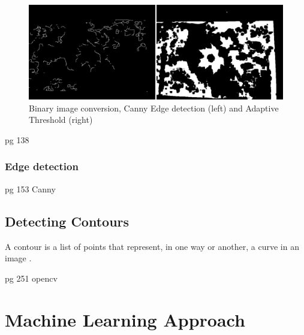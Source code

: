 \begin{figure}[h!]
\centering
    \includegraphics[width=1.0\textwidth]{leaf_identification/images/convert_to_binary.png}
    \caption{Binary image conversion, Canny Edge detection (left) and Adaptive Threshold (right)}%
    \label{preprocessing}
\end{figure}

pg 138

\subsubsection{Edge detection}
pg 153
Canny 

\subsection{Detecting Contours}
A contour is a list of points that represent, in one way or another, a curve in an image \cite{bradski08}. 

pg 251 opencv

\section{Machine Learning Approach}
